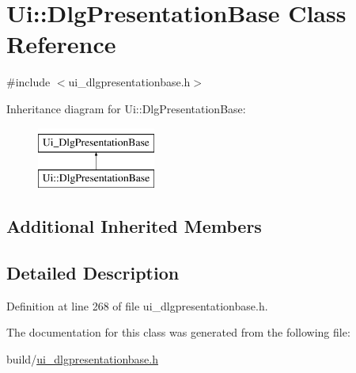 \hypertarget{classUi_1_1DlgPresentationBase}{\section{Ui\+:\+:Dlg\+Presentation\+Base Class Reference}
\label{classUi_1_1DlgPresentationBase}
}


{\ttfamily \#include $<$ui\+\_\+dlgpresentationbase.\+h$>$}

Inheritance diagram for Ui\+:\+:Dlg\+Presentation\+Base\+:\begin{figure}[H]
\begin{center}
\leavevmode
\includegraphics[height=2.000000cm]{classUi_1_1DlgPresentationBase}
\end{center}
\end{figure}
\subsection*{Additional Inherited Members}


\subsection{Detailed Description}


Definition at line 268 of file ui\+\_\+dlgpresentationbase.\+h.



The documentation for this class was generated from the following file\+:\begin{DoxyCompactItemize}
\item 
build/\hyperlink{ui__dlgpresentationbase_8h}{ui\+\_\+dlgpresentationbase.\+h}\end{DoxyCompactItemize}
